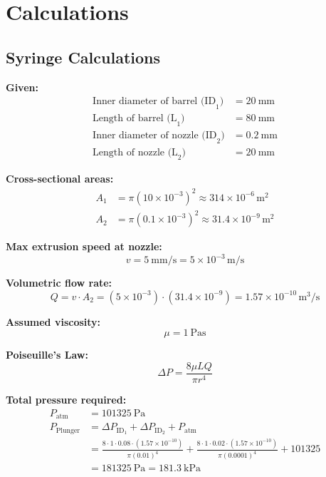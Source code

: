 \chapter{Calculations}

\section{Syringe Calculations}

\textbf{Given:}
\begin{align*}
\text{Inner diameter of barrel (ID}_1\text{)} &= \SI{20}{\milli\meter} \\
\text{Length of barrel (L}_1\text{)} &= \SI{80}{\milli\meter} \\
\text{Inner diameter of nozzle (ID}_2\text{)} &= \SI{0.2}{\milli\meter} \\
\text{Length of nozzle (L}_2\text{)} &= \SI{20}{\milli\meter}
\end{align*}

\noindent\textbf{Cross-sectional areas:}
\begin{align*}
A_1 &= \pi \left(10 \times 10^{-3}\right)^2 \approx 314 \times 10^{-6} \, \si{\meter\squared} \\
A_2 &= \pi \left(0.1 \times 10^{-3}\right)^2 \approx 31.4 \times 10^{-9} \, \si{\meter\squared}
\end{align*}

\noindent\textbf{Max extrusion speed at nozzle:}
\[
v = \SI{5}{\milli\meter\per\second} = 5 \times 10^{-3} \, \si{\meter\per\second}
\]

\noindent\textbf{Volumetric flow rate:}
\[
Q = v \cdot A_2 = (5 \times 10^{-3}) \cdot (31.4 \times 10^{-9}) = 1.57 \times 10^{-10} \, \si{\meter\cubed\per\second}
\]

\noindent\textbf{Assumed viscosity:} 
\[
\mu = \SI{1}{\pascal\second}
\]

\noindent\textbf{Poiseuille's Law:}
\[
\Delta P = \frac{8 \mu L Q}{\pi r^4}
\]

\noindent\textbf{Total pressure required:}
\begin{align*}
P_{\text{atm}} &= \SI{101325}{\pascal} \\
P_{\text{Plunger}} &= \Delta P_{\text{ID}_1} + \Delta P_{\text{ID}_2} + P_{\text{atm}} \\
&= \frac{8 \cdot 1 \cdot 0.08 \cdot (1.57 \times 10^{-10})}{\pi (0.01)^4}
+ \frac{8 \cdot 1 \cdot 0.02 \cdot (1.57 \times 10^{-10})}{\pi (0.0001)^4}
+ 101325 \\
&= \SI{181325}{\pascal} = \boxed{\SI{181.3}{\kilo\pascal}}
\end{align*}


